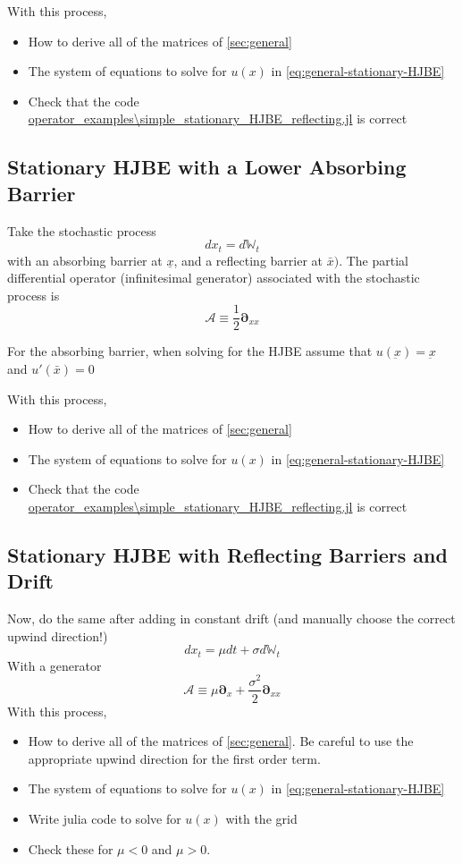 \documentclass[11pt]{article}
\newcommand{\D}[1][]{\ensuremath{\boldsymbol{\partial}_{#1}}}
\newcommand{\W}{\ensuremath{\mathbb{W}}}
\newcommand{\A}{\ensuremath{\mathcal{A}}}
\begin{document}
With this process,
\begin{itemize}
	\item How to derive all of the matrices of \cref{sec:general}
	\item The system of equations to solve for $u(x)$ in \cref{eq:general-stationary-HJBE}
	\item Check that the code \url{operator_examples\simple_stationary_HJBE_reflecting.jl} is correct
\end{itemize}

\subsection{Stationary HJBE with a Lower Absorbing Barrier}
Take the stochastic process
$$
d x_t = d \W_t
$$
with an absorbing barrier at $\underline{x}$, and a reflecting barrier at $\bar{x})$.  The partial differential operator (infinitesimal generator) associated with the stochastic process is
$$
\A \equiv \frac{1}{2}\D[xx]
$$

For the absorbing barrier, when solving for the HJBE assume that $u(\underbar{x}) = \underbar{x}$ and $u'(\bar{x}) = 0$


With this process,
\begin{itemize}
	\item How to derive all of the matrices of \cref{sec:general}
	\item The system of equations to solve for $u(x)$ in \cref{eq:general-stationary-HJBE}
	\item Check that the code \url{operator_examples\simple_stationary_HJBE_reflecting.jl} is correct
\end{itemize}


\subsection{Stationary HJBE with Reflecting Barriers and Drift}
Now, do the same after adding in constant drift (and manually choose the correct upwind direction!)
$$
d x_t = \mu dt + \sigma d\W_t
$$
With a generator
$$
	\A \equiv \mu \D[x] + \frac{\sigma^2}{2}\D[xx]
$$
With this process,
\begin{itemize}
	\item How to derive all of the matrices of \cref{sec:general}.  Be careful to use the appropriate upwind direction for the first order term.
	\item The system of equations to solve for $u(x)$ in \cref{eq:general-stationary-HJBE}
	\item Write julia code to solve for $u(x)$ with the grid
	\item Check these for $\mu < 0$ and $\mu > 0$.
\end{itemize}
\end{document}
